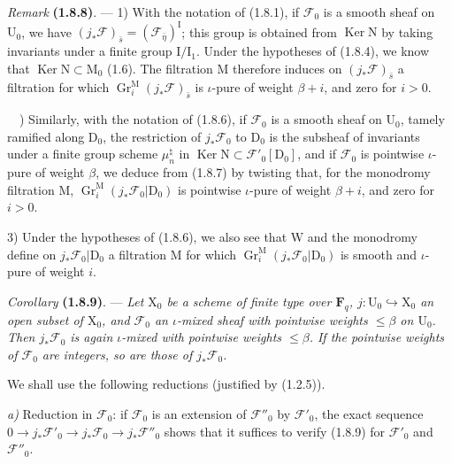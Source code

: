 \documentclass[11pt,leqno]{article}
\newcommand{\Page}[1]{\ifvmode\noindent\else\unskip\ \fi{\footnotesize\textcolor{gray}{[p.\,#1]}}\ \ignorespaces}
\begin{document}
\textit{Remark} \textbf{(1.8.8)}. — 1) With the notation of (1.8.1), if \(\mathscr{F}_0\) is a smooth sheaf on \(\mathrm{U}_0\), we have \((j_*\mathscr{F})_{\bar{s}}=(\mathscr{F}_{\bar{\eta}})^{\mathrm{I}}\); this group is obtained from \(\operatorname{Ker}\mathrm{N}\) by taking invariants under a finite group \(\mathrm{I}/\mathrm{I}_1\). Under the hypotheses of (1.8.4), we know that \(\operatorname{Ker}\mathrm{N}\subset\mathrm{M}_0\) (1.6). The filtration \(\mathrm{M}\) therefore induces on \((j_*\mathscr{F})_{\bar{s}}\) a filtration for which \(\operatorname{Gr}_i^{\mathrm{M}}(j_*\mathscr{F})_{\bar{s}}\) is \(\iota\)-pure of weight \(\beta+i\), and zero for \(i>0\).

\Page{177}
2) Similarly, with the notation of (1.8.6), if \(\mathscr{F}_0\) is a smooth sheaf on \(\mathrm{U}_0\), tamely ramified along \(\mathrm{D}_0\), the restriction of \(j_*\mathscr{F}_0\) to \(\mathrm{D}_0\) is the subsheaf of invariants under a finite group scheme \(\mu^{\natural}_n\) in \(\operatorname{Ker}\mathrm{N}\subset\mathscr{F}'_0[\mathrm{D}_0]\), and if \(\mathscr{F}_0\) is pointwise \(\iota\)-pure of weight \(\beta\), we deduce from (1.8.7) by twisting that, for the monodromy filtration \(\mathrm{M}\), \(\operatorname{Gr}_i^{\mathrm{M}}(j_*\mathscr{F}_0\vert\mathrm{D}_0)\) is pointwise \(\iota\)-pure of weight \(\beta+i\), and zero for \(i>0\).

3) Under the hypotheses of (1.8.6), we also see that \(\mathrm{W}\) and the monodromy define on \(j_*\mathscr{F}_0\vert\mathrm{D}_0\) a filtration \(\mathrm{M}\) for which \(\operatorname{Gr}_i^{\mathrm{M}}(j_*\mathscr{F}_0\vert\mathrm{D}_0)\) is smooth and \(\iota\)-pure of weight \(i\).

\textit{Corollary} \textbf{(1.8.9)}. — \textit{Let \(\mathrm{X}_0\) be a scheme of finite type over \(\mathbf{F}_q\), \(j:\mathrm{U}_0\hookrightarrow\mathrm{X}_0\) an open subset of \(\mathrm{X}_0\), and \(\mathscr{F}_0\) an \(\iota\)-mixed sheaf with pointwise weights \(\leq\beta\) on \(\mathrm{U}_0\). Then \(j_*\mathscr{F}_0\) is again \(\iota\)-mixed with pointwise weights \(\leq\beta\). If the pointwise weights of \(\mathscr{F}_0\) are integers, so are those of \(j_*\mathscr{F}_0\).}

We shall use the following reductions (justified by (1.2.5)).

\textit{a)} Reduction in \(\mathscr{F}_0\): if \(\mathscr{F}_0\) is an extension of \(\mathscr{F}''_0\) by \(\mathscr{F}'_0\), the exact sequence \(0\to j_*\mathscr{F}'_0\to j_*\mathscr{F}_0\to j_*\mathscr{F}''_0\) shows that it suffices to verify (1.8.9) for \(\mathscr{F}'_0\) and \(\mathscr{F}''_0\).
\end{document}
